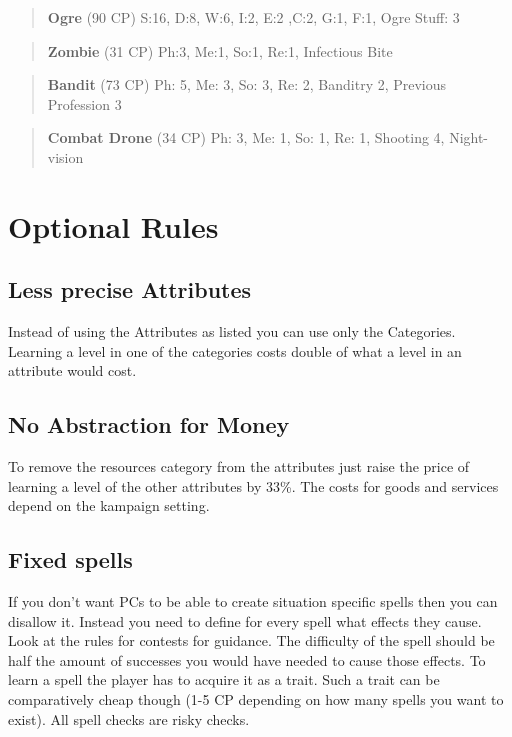 \documentclass[11pt]{article}
\begin{document}
{\begin{multicols}{2}[]
\begin{quote}
\textbf{Ogre} (90 CP)
S:16, D:8, W:6, I:2, E:2 ,C:2, G:1, F:1, Ogre Stuff: 3
\end{quote}

\begin{quote}
\textbf{Zombie} (31 CP)
Ph:3, Me:1, So:1, Re:1, Infectious Bite
\end{quote}

\begin{quote}
\textbf{Bandit} (73 CP)
Ph: 5, Me: 3, So: 3, Re: 2, Banditry 2, Previous Profession 3
\end{quote}

\begin{quote}
\textbf{Combat Drone} (34 CP)
Ph: 3, Me: 1, So: 1, Re: 1, Shooting 4, Night-vision
\end{quote}



\newpage
\section{Optional Rules}
\label{sec:orgb4428ab}

\subsection{Less precise Attributes}
\label{sec:orgea8d239}
Instead of using the Attributes as listed you can use only the Categories. Learning a level in one of the categories costs double of what a level in an attribute would cost.

\subsection{No Abstraction for Money}
\label{sec:org9fd830e}
To remove the resources category from the attributes just raise the price of learning a level of the other attributes by 33\%. The costs for goods and services depend on the kampaign setting.

\subsection{Fixed spells}
\label{sec:org3845121}
If you don't want PCs to be able to create situation specific spells then you can disallow it. Instead you need to define for every spell what effects they cause. Look at the rules for contests for guidance. The difficulty of the spell should be half the amount of successes you would have needed to cause those effects. To learn a spell the player has to acquire it as a trait. Such a trait can be comparatively cheap though (1-5 CP depending on how many spells you want to exist). All spell checks are risky checks.


\end{multicols}}
\end{document}
